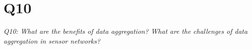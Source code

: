 \chapter{Q10}
\emph{Q10: What are the benefits of data aggregation? What are the challenges
of data aggregation in sensor networks?}
